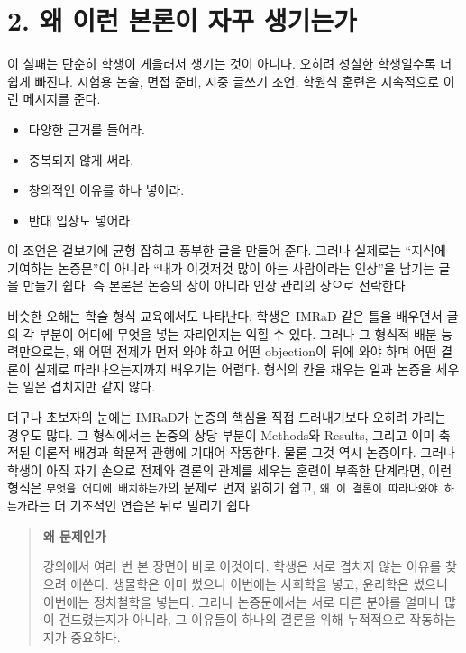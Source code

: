 \section{2. 왜 이런 본론이 자꾸 생기는가}\label{2-uxc65c-uxc774uxb7f0-uxbcf8uxb860uxc774-uxc790uxafb8-uxc0dduxae30uxb294uxac00}

이 실패는 단순히 학생이 게을러서 생기는 것이 아니다. 오히려 성실한 학생일수록 더 쉽게 빠진다. 시험용 논술, 면접 준비, 시중 글쓰기 조언, 학원식 훈련은 지속적으로 이런 메시지를 준다.

\begin{itemize}
\tightlist
\item
  다양한 근거를 들어라.
\item
  중복되지 않게 써라.
\item
  창의적인 이유를 하나 넣어라.
\item
  반대 입장도 넣어라.
\end{itemize}

이 조언은 겉보기에 균형 잡히고 풍부한 글을 만들어 준다. 그러나 실제로는 ``지식에 기여하는 논증문''이 아니라 ``내가 이것저것 많이 아는 사람이라는 인상''을 남기는 글을 만들기 쉽다. 즉 본론은 논증의 장이 아니라 인상 관리의 장으로 전락한다.

비슷한 오해는 학술 형식 교육에서도 나타난다. 학생은 IMRaD 같은 틀을 배우면서 글의 각 부분이 어디에 무엇을 넣는 자리인지는 익힐 수 있다. 그러나 그 형식적 배분 능력만으로는, 왜 어떤 전제가 먼저 와야 하고 어떤 objection이 뒤에 와야 하며 어떤 결론이 실제로 따라나오는지까지 배우기는 어렵다. 형식의 칸을 채우는 일과 논증을 세우는 일은 겹치지만 같지 않다.

더구나 초보자의 눈에는 IMRaD가 논증의 핵심을 직접 드러내기보다 오히려 가리는 경우도 많다. 그 형식에서는 논증의 상당 부분이 Methods와 Results, 그리고 이미 축적된 이론적 배경과 학문적 관행에 기대어 작동한다. 물론 그것 역시 논증이다. 그러나 학생이 아직 자기 손으로 전제와 결론의 관계를 세우는 훈련이 부족한 단계라면, 이런 형식은 \texttt{무엇을\ 어디에\ 배치하는가}의 문제로 먼저 읽히기 쉽고, \texttt{왜\ 이\ 결론이\ 따라나와야\ 하는가}라는 더 기초적인 연습은 뒤로 밀리기 쉽다.

\begin{quote}
\textbf{왜 문제인가}

강의에서 여러 번 본 장면이 바로 이것이다. 학생은 서로 겹치지 않는 이유를 찾으려 애쓴다. 생물학은 이미 썼으니 이번에는 사회학을 넣고, 윤리학은 썼으니 이번에는 정치철학을 넣는다. 그러나 논증문에서는 서로 다른 분야를 얼마나 많이 건드렸는지가 아니라, 그 이유들이 하나의 결론을 위해 누적적으로 작동하는지가 중요하다.
\end{quote}

